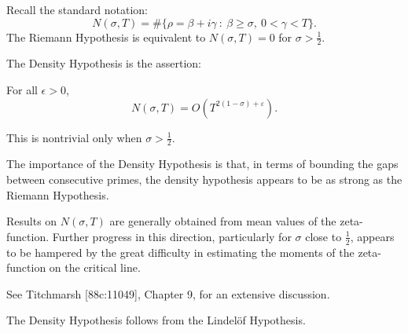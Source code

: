 \documentclass[12pt,letterpaper, reqno]{amsart}
\begin{document}
\begin{problemblock}
Recall the standard notation:
$$
N(\sigma,T) = \#\{\rho=\beta+i\gamma\ :\ \beta \ge \sigma,\ 0<\gamma<T\}.
$$
The Riemann Hypothesis is equivalent to $N(\sigma,T)=0$ for $\sigma>\frac12$.

The Density Hypothesis is the assertion:
\begin{problem}[2.2] For all $\epsilon>0$,
$$
N(\sigma,T) = O(T^{2(1-\sigma)+\varepsilon}) .
$$

\end{problem}

\begin{distinguishedremark}
This is nontrivial 
only when $\sigma > \frac12$.
\end{distinguishedremark}

\begin{remark}
The importance of the Density Hypothesis is that, in terms of 
bounding the gaps between consecutive primes, the density hypothesis
appears to be as strong as the Riemann Hypothesis.
\end{remark}

\begin{remark}
Results on $N(\sigma,T)$ are generally obtained from mean
values of the zeta-function.  Further progress in this
direction, particularly for $\sigma$ close to $\frac12$, appears
to be hampered  by the great difficulty in estimating the
moments of the zeta-function on the critical line.

See Titchmarsh [88c:11049], Chapter 9, for an extensive discussion.

\end{remark}

\begin{remark}
The Density Hypothesis follows from the Lindel\"of Hypothesis.
\end{remark}
\end{problemblock}
\end{document}
